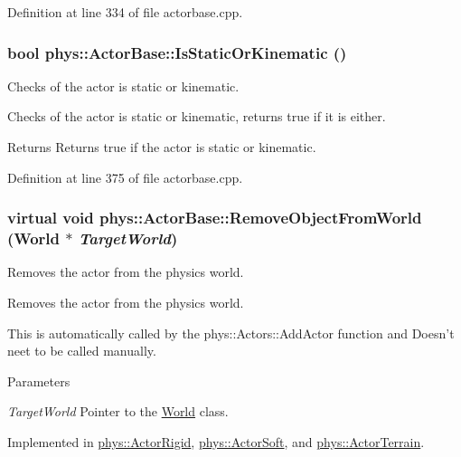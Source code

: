 Definition at line 334 of file actorbase.cpp.

\hypertarget{classphys_1_1ActorBase_a0758873d315a0f70871649493d78d739}{
\subsubsection[{IsStaticOrKinematic}]{\setlength{\rightskip}{0pt plus 5cm}bool phys::ActorBase::IsStaticOrKinematic ()}}
\label{d8/d0f/classphys_1_1ActorBase_a0758873d315a0f70871649493d78d739}


Checks of the actor is static or kinematic. 

Checks of the actor is static or kinematic, returns true if it is either. \begin{DoxyReturn}{Returns}
Returns true if the actor is static or kinematic. 
\end{DoxyReturn}


Definition at line 375 of file actorbase.cpp.

\hypertarget{classphys_1_1ActorBase_aaa787de7ec5d7d1d8428ea78f37bcb40}{
\subsubsection[{RemoveObjectFromWorld}]{\setlength{\rightskip}{0pt plus 5cm}virtual void phys::ActorBase::RemoveObjectFromWorld ({\bf World} $\ast$ {\em TargetWorld})}}
\label{d8/d0f/classphys_1_1ActorBase_aaa787de7ec5d7d1d8428ea78f37bcb40}


Removes the actor from the physics world. 

Removes the actor from the physics world. \par
 This is automatically called by the phys::Actors::AddActor function and Doesn't neet to be called manually. 
\begin{DoxyParams}{Parameters}
\item[{\em TargetWorld}]Pointer to the \hyperlink{classphys_1_1World}{World} class. \end{DoxyParams}


Implemented in \hyperlink{classphys_1_1ActorRigid_a7101df2a149e0ccb3678b7c2c00998f8}{phys::ActorRigid}, \hyperlink{classphys_1_1ActorSoft_ab65d106fcc1ee5243a990e7b42326bf0}{phys::ActorSoft}, and \hyperlink{classphys_1_1ActorTerrain_aeded1fdabfc4dd407f81fcc5b97c1f77}{phys::ActorTerrain}.

